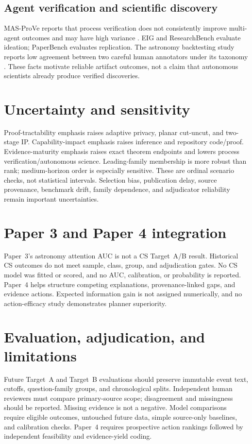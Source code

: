 \documentclass[11pt]{article}
\begin{document}
\subsection{Agent verification and scientific discovery}
MAS-ProVe reports that process verification does not consistently improve multi-agent outcomes and may have high variance \citep{venkataramani2026masprove}. EIG and ResearchBench evaluate ideation; PaperBench evaluates replication. The astronomy backtesting study reports low agreement between two careful human annotators under its taxonomy \citep{mao2026backtesting}. These facts motivate reliable artifact outcomes, not a claim that autonomous scientists already produce verified discoveries.

\section{Uncertainty and sensitivity}
Proof-tractability emphasis raises adaptive privacy, planar cut-uncut, and two-stage IP. Capability-impact emphasis raises inference and repository code/proof. Evidence-maturity emphasis raises exact theorem endpoints and lowers process verification/autonomous science. Leading-family membership is more robust than rank; medium-horizon order is especially sensitive. These are ordinal scenario checks, not statistical intervals. Selection bias, publication delay, source provenance, benchmark drift, family dependence, and adjudicator reliability remain important uncertainties.

\section{Paper 3 and Paper 4 integration}
Paper~3's astronomy attention AUC is not a CS Target~A/B result. Historical CS outcomes do not meet sample, class, group, and adjudication gates. No CS model was fitted or scored, and no AUC, calibration, or probability is reported. Paper~4 helps structure competing explanations, provenance-linked gaps, and evidence actions. Expected information gain is not assigned numerically, and no action-efficacy study demonstrates planner superiority.

\section{Evaluation, adjudication, and limitations}
Future Target~A and Target~B evaluations should preserve immutable event text, cutoffs, question-family groups, and chronological splits. Independent human reviewers must compare primary-source scope; disagreement and missingness should be reported. Missing evidence is not a negative. Model comparisons require eligible outcomes, untouched future data, simple source-only baselines, and calibration checks. Paper~4 requires prospective action rankings followed by independent feasibility and evidence-yield coding.
\end{document}
